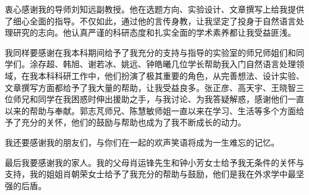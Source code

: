 
\begin{acknowledgements}
  衷心感谢我的导师刘知远副教授。他在选题方向、实验设计、文章撰写上给我提供了细心全面的指导。不仅如此，通过他的言传身教，让我坚定了投身于自然语言处理研究的志向。他认真严谨的科研态度和扎实全面的学术素养都让我受益匪浅。
  
  我同样要感谢在我本科期间给予了我充分的支持与指导的实验室的师兄师姐们和同学们。涂存超、韩旭、谢若冰、姚远、钟皓曦几位学长帮助我入门自然语言处理领域，在我本科科研工作中，他们扮演了极其重要的角色，从完善想法、设计实验、文章撰写方面都给予了我大量的帮助，让我受益良多。张正彦、高天宇、王晓智三位师兄和同学在我困惑时伸出援助之手，与我讨论、为我答疑解惑，感谢他们一直以来的帮助与奉献。郭志芃师兄、陈慧敏师姐一直以来在学习、生活等多个方面给予了充分的关怀，他们的鼓励与帮助也成为了我不断成长的动力。
  
  我还要感谢我的朋友们，与你们在一起的欢声笑语将成为一生难忘的记忆。
  
  最后我要感谢我的家人。我的父母肖运锋先生和钟小芳女士给予我无条件的关怀与支持，我的姐姐肖朝荣女士给予了我充分的帮助与鼓励，他们是我在外求学中最坚强的后盾。
  
  
\end{acknowledgements}
